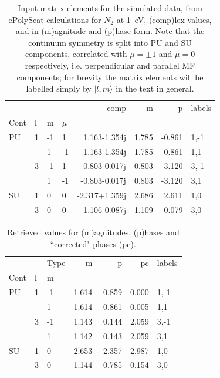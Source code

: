 \documentclass[10pt]{article}
\begin{document}
\begin{table}
\centering
\begin{tabular}{llllrrrl}
\toprule
   &   &    &    &          comp &     m &      p & labels \\
Cont & l & m & $\mu$ &               &       &        &        \\
\midrule
PU & 1 & -1 &  1 &  1.163-1.354j & 1.785 & -0.861 &   1,-1 \\
   &   &  1 & -1 &  1.163-1.354j & 1.785 & -0.861 &    1,1 \\
   & 3 & -1 &  1 & -0.803-0.017j & 0.803 & -3.120 &   3,-1 \\
   &   &  1 & -1 & -0.803-0.017j & 0.803 & -3.120 &    3,1 \\
SU & 1 &  0 &  0 & -2.317+1.359j & 2.686 &  2.611 &    1,0 \\
   & 3 &  0 &  0 &  1.106-0.087j & 1.109 & -0.079 &    3,0 \\
\bottomrule
\end{tabular}

\caption{\label{tab:inputMatE}Input matrix elements for the simulated data, from ePolyScat calculations for $N_2$ at 1~eV, (comp)lex values, and in (m)agnitude and (p)hase form. Note that the continuum symmetry is split into PU and SU components, correlated with $\mu=\pm1$ and $\mu=0$ respectively, i.e. perpendicular and parallel MF components; for brevity the matrix elements will be labelled simply by $|l,m\rangle$ in the text in general.}
\end{table}
\begin{table}
\centering
\begin{tabular}{lllrrrl}
\toprule
   &   & Type &     m &      p &    pc & labels \\
Cont & l & m &       &        &       &        \\
\midrule
PU & 1 & -1 & 1.614 & -0.859 & 0.000 &   1,-1 \\
   &   &  1 & 1.614 & -0.861 & 0.005 &    1,1 \\
   & 3 & -1 & 1.143 &  0.144 & 2.059 &   3,-1 \\
   &   &  1 & 1.142 &  0.143 & 2.059 &    3,1 \\
SU & 1 &  0 & 2.653 &  2.357 & 2.987 &    1,0 \\
   & 3 &  0 & 1.144 & -0.785 & 0.154 &    3,0 \\
\bottomrule
\end{tabular}

\caption{\label{tab:aggMatE}Retrieved values for (m)agnitudes, (p)hases and ``corrected" phases (pc).}
\end{table}
\end{document}
